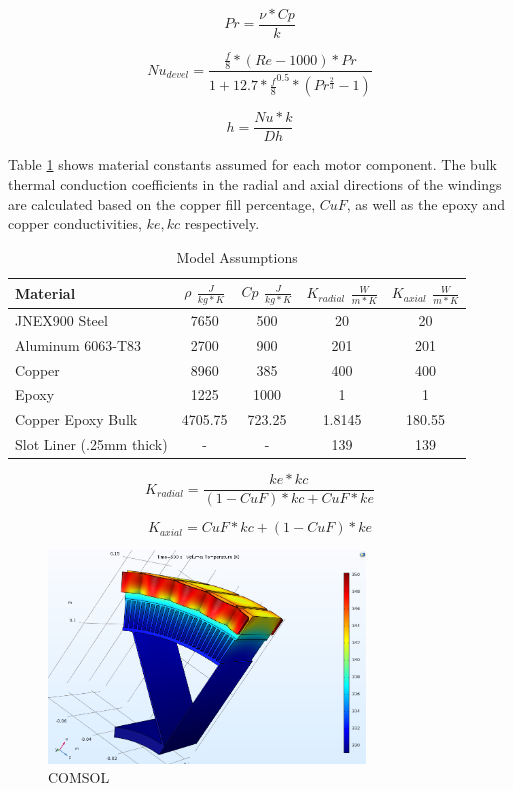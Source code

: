 \documentclass[]{aiaa-tc}%
\begin{document}
\begin{equation}
Pr = \frac{\nu*Cp}{k}
\label{eq:Pr}
\end{equation}

\begin{equation}
Nu_{devel} = \frac{\frac{f}{8}*(Re-1000)*Pr}{1+12.7*\frac{f}{8}^{0.5}*(Pr^{\frac{2}{3}}-1)}
\label{eq:Nu}
\end{equation}

\begin{equation}
h = \frac{Nu*k}{Dh}
\label{eq:h}
\end{equation}

Table \ref{tab:COMSOL} shows material constants assumed for each motor component. The bulk thermal conduction coefficients in the radial and axial directions of the windings are calculated based on the copper fill percentage, $CuF$, as well as the epoxy and copper conductivities, $ke, kc$ respectively.

\begin{table}[hbt!]
\caption{\label{tab:COMSOL} Model Assumptions}
\centering
\begin{tabular}{lcccc}
Material  & $\rho$ $\frac{J}{kg*K}$ & $Cp$ $\frac{J}{kg*K}$  & $K_{radial}$ $\frac{W}{m*K}$ & $K_{axial}$ $\frac{W}{m*K}$\\\hline
JNEX900 Steel & 7650& 500& 20& 20\\
Aluminum 6063-T83   & 2700  & 900 & 201& 201  \\
Copper & 8960 & 385 & 400& 400\\
Epoxy & 1225 & 1000 & 1& 1 \\
Copper Epoxy Bulk & 4705.75 & 723.25 & 1.8145 & 180.55\\
Slot Liner (.25mm thick) &-&-&139 & 139\\\hline
\end{tabular}
\end{table}

\begin{equation}
K_{radial} = \frac{ke*kc}{(1-CuF)*kc + CuF*ke}
\label{eq:kradial}
\end{equation}

\begin{equation}
K_{axial} = CuF*kc + (1-CuF)*ke
\label{eq:kaxial}
\end{equation}

\begin{figure}[!htb]%
	\centering
	\includegraphics[width=0.75\textwidth]{figures/jmx57_motor_comsol.png}
	\caption{COMSOL}
	\label{fig:comsol}
\end{figure}
\end{document}
